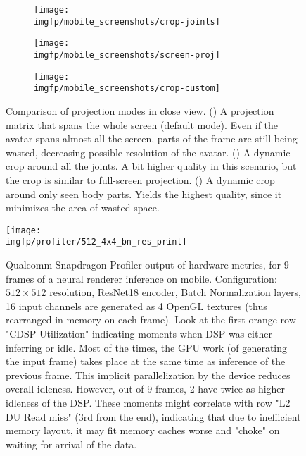 \begin{figure}
	\centering
	\begin{subfigure}[b]{0.32\textwidth}
		\centering
		\texttt{[image: \\imgfp/mobile\_screenshots/crop-joints]}%
		\caption{}
		\label{fig:zoom_inefficient_crop}
	\end{subfigure}
	\hfill
	\begin{subfigure}[b]{0.32\textwidth}
		\centering
		\texttt{[image: \\imgfp/mobile\_screenshots/screen-proj]}
		\caption{}
		\label{fig:zoom_screen_crop}
	\end{subfigure}
	\hfill
	\begin{subfigure}[b]{0.32\textwidth}
		\centering
		\texttt{[image: \\imgfp/mobile\_screenshots/crop-custom]}
		\caption{}
		\label{fig:zoom_smallest_crop}
	\end{subfigure}
	\caption{Comparison of projection modes in close view. (\protect{}) A projection matrix that spans the whole screen (default mode). Even if the avatar spans almost all the screen, parts of the frame are still being wasted, decreasing possible resolution of the avatar. (\protect{}) A dynamic crop around all the joints. A bit higher quality in this scenario, but the crop is similar to full-screen projection. (\protect{}) A dynamic crop around only seen body parts. Yields the highest quality, since it minimizes the area of wasted space.}
	\label{fig:zoom_examples}
\end{figure}


\begin{figure}
	\centering
	\texttt{[image: \\imgfp/profiler/512\_4x4\_bn\_res\_print]}
	\caption{Qualcomm Snapdragon Profiler output of hardware metrics, for 9 frames of a neural renderer inference on mobile. Configuration: $512\times512$ resolution, ResNet18 encoder, Batch Normalization layers, 16 input channels are generated as 4 OpenGL textures (thus rearranged in memory on each frame). Look at the first orange row "CDSP Utilization" indicating moments when DSP was either inferring or idle. Most of the times, the GPU work (of generating the input frame) takes place at the same time as inference of the previous frame. This implicit parallelization by the device reduces overall idleness. However, out of 9 frames, 2 have twice as higher idleness of the DSP. These moments might correlate with row "L2 DU Read miss" (3rd from the end), indicating that due to inefficient memory layout, it may fit memory caches worse and "choke" on waiting for arrival of the data.}
	\label{fig:profiler_4x4_bn_res}
\end{figure}

